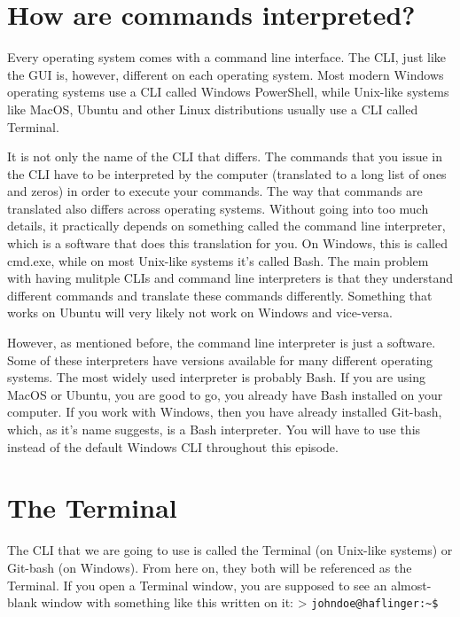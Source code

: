 \documentclass[
]{book}
\begin{document}
\hypertarget{how-are-commands-interpreted}{%
\section{How are commands interpreted?}\label{how-are-commands-interpreted}}

Every operating system comes with a command line interface. The CLI, just like the GUI is, however, different on each operating system. Most modern Windows operating systems use a CLI called Windows PowerShell, while Unix-like systems like MacOS, Ubuntu and other Linux distributions usually use a CLI called Terminal.

It is not only the name of the CLI that differs. The commands that you issue in the CLI have to be interpreted by the computer (translated to a long list of ones and zeros) in order to execute your commands. The way that commands are translated also differs across operating systems. Without going into too much details, it practically depends on something called the command line interpreter, which is a software that does this translation for you. On Windows, this is called cmd.exe, while on most Unix-like systems it's called Bash. The main problem with having mulitple CLIs and command line interpreters is that they understand different commands and translate these commands differently. Something that works on Ubuntu will very likely not work on Windows and vice-versa.

However, as mentioned before, the command line interpreter is just a software. Some of these interpreters have versions available for many different operating systems. The most widely used interpreter is probably Bash. If you are using MacOS or Ubuntu, you are good to go, you already have Bash installed on your computer. If you work with Windows, then you have already installed Git-bash, which, as it's name suggests, is a Bash interpreter. You will have to use this instead of the default Windows CLI throughout this episode.

\hypertarget{the-terminal}{%
\section{The Terminal}\label{the-terminal}}

The CLI that we are going to use is called the Terminal (on Unix-like systems) or Git-bash (on Windows). From here on, they both will be referenced as the Terminal. If you open a Terminal window, you are supposed to see an almost-blank window with something like this written on it:
\textgreater{} \texttt{johndoe@haflinger:\textasciitilde{}\$}
\end{document}
